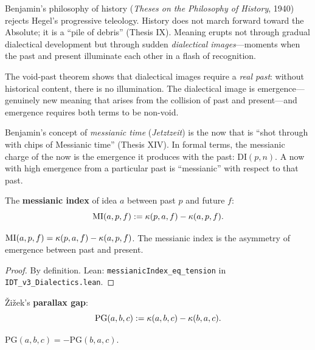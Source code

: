 \begin{interpretation}
Benjamin's philosophy of history (\textit{Theses on the Philosophy of History},
1940) rejects Hegel's progressive teleology. History does not march forward
toward the Absolute; it is a ``pile of debris'' (Thesis IX). Meaning erupts
not through gradual dialectical development but through sudden
\emph{dialectical images}---moments when the past and present illuminate each
other in a flash of recognition.

The void-past theorem shows that dialectical images require a \emph{real past}:
without historical content, there is no illumination. The dialectical image
is emergence---genuinely new meaning that arises from the collision of past
and present---and emergence requires both terms to be non-void.

Benjamin's concept of \emph{messianic time} (\textit{Jetztzeit}) is the
now that is ``shot through with chips of Messianic time'' (Thesis XIV).
In formal terms, the messianic charge of the now is the emergence it
produces with the past: $\mathrm{DI}(p, n)$. A now with high emergence
from a particular past is ``messianic'' with respect to that past.
\end{interpretation}

\begin{definition}
\label{def:messianic-index}
The \textbf{messianic index} of idea $a$ between past $p$ and future $f$:
\[
\mathrm{MI}(a, p, f) := \kappa(p, a, f) - \kappa(a, p, f).
\]
\end{definition}

\begin{theorem}
\label{thm:messianic-tension}
$\mathrm{MI}(a, p, f) = \kappa(p, a, f) - \kappa(a, p, f)$.
The messianic index is the asymmetry of emergence between past and present.
\end{theorem}

\begin{proof}
By definition.
Lean: \texttt{messianicIndex\_eq\_tension} in
\texttt{IDT\_v3\_Dialectics.lean}.
\end{proof}

\begin{definition}
\label{def:parallax-gap}
\v{Z}i\v{z}ek's \textbf{parallax gap}:
\[
\mathrm{PG}(a, b, c) := \kappa(a, b, c) - \kappa(b, a, c).
\]
\end{definition}

\begin{theorem}
\label{thm:parallax-antisymm}
$\mathrm{PG}(a, b, c) = -\mathrm{PG}(b, a, c)$.
\end{theorem}

